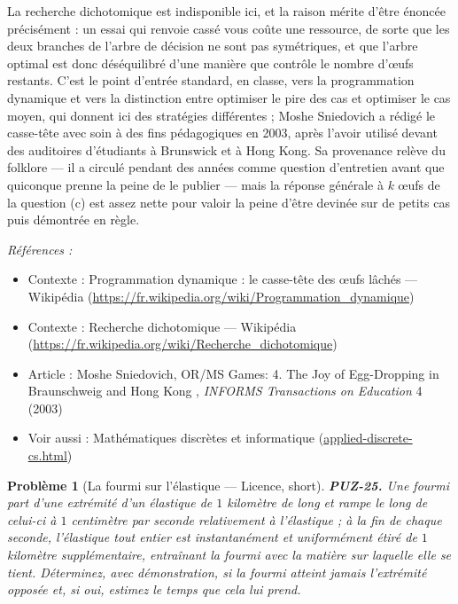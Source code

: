 \documentclass[11pt]{article}
\newtheorem{problem}{Problème}
\newenvironment{refs}{\par\small\noindent\emph{Références :}\begin{itemize}\setlength\itemsep{0pt}}{\end{itemize}\normalsize}
\begin{document}
\noindent La recherche dichotomique est indisponible ici, et la raison mérite d'être énoncée précisément : un essai qui renvoie \og{} cassé \fg{} vous coûte une ressource, de sorte que les deux branches de l'arbre de décision ne sont pas symétriques, et que l'arbre optimal est donc déséquilibré d'une manière que contrôle le nombre d'\oe{}ufs restants. C'est le point d'entrée standard, en classe, vers la programmation dynamique et vers la distinction entre optimiser le pire des cas et optimiser le cas moyen, qui donnent ici des stratégies différentes ; Moshe Sniedovich a rédigé le casse-tête avec soin à des fins pédagogiques en 2003, après l'avoir utilisé devant des auditoires d'étudiants à Brunswick et à Hong Kong. Sa provenance relève du folklore --- il a circulé pendant des années comme question d'entretien avant que quiconque prenne la peine de le publier --- mais la réponse générale à $ k $ \oe{}ufs de la question (c) est assez nette pour valoir la peine d'être devinée sur de petits cas puis démontrée en règle.

\begin{refs}
\item Contexte : Programmation dynamique : le casse-tête des \oe{}ufs lâchés --- Wikipédia (\url{https://fr.wikipedia.org/wiki/Programmation_dynamique})
\item Contexte : Recherche dichotomique --- Wikipédia (\url{https://fr.wikipedia.org/wiki/Recherche_dichotomique})
\item Article : Moshe Sniedovich, \og{} OR/MS Games: 4. The Joy of Egg-Dropping in Braunschweig and Hong Kong \fg{}, \textit{INFORMS Transactions on Education} 4 (2003)
\item Voir aussi : Mathématiques discrètes et informatique (\url{applied-discrete-cs.html})
\end{refs}

\bigskip

\begin{problem}[{La fourmi sur l'élastique --- Licence, short}]
\textbf{PUZ-25.} Une fourmi part d'une extrémité d'un élastique de $ 1 $ kilomètre de long et rampe le long de celui-ci à $ 1 $ centimètre par seconde relativement à l'élastique ; à la fin de chaque seconde, l'élastique tout entier est instantanément et uniformément étiré de $ 1 $ kilomètre supplémentaire, entraînant la fourmi avec la matière sur laquelle elle se tient. Déterminez, avec démonstration, si la fourmi atteint jamais l'extrémité opposée et, si oui, estimez le temps que cela lui prend.
\end{problem}
\end{document}
